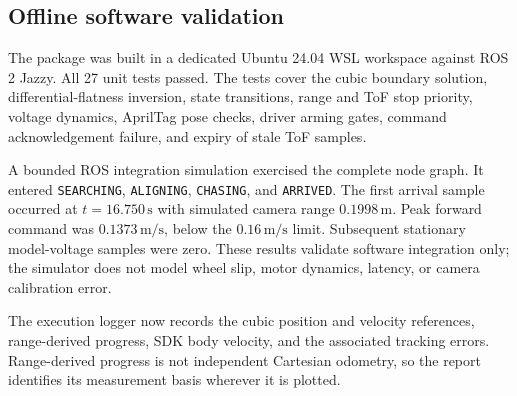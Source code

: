 \subsection{Offline software validation}
The package was built in a dedicated Ubuntu 24.04 WSL workspace against ROS 2 Jazzy. All 27 unit tests passed. The tests cover the cubic boundary solution, differential-flatness inversion, state transitions, range and ToF stop priority, voltage dynamics, AprilTag pose checks, driver arming gates, command acknowledgement failure, and expiry of stale ToF samples.

A bounded ROS integration simulation exercised the complete node graph. It entered \texttt{SEARCHING}, \texttt{ALIGNING}, \texttt{CHASING}, and \texttt{ARRIVED}. The first arrival sample occurred at $t=16.750\,\mathrm{s}$ with simulated camera range $0.1998\,\mathrm{m}$. Peak forward command was $0.1373\,\mathrm{m/s}$, below the $0.16\,\mathrm{m/s}$ limit. Subsequent stationary model-voltage samples were zero. These results validate software integration only; the simulator does not model wheel slip, motor dynamics, latency, or camera calibration error.

The execution logger now records the cubic position and velocity references, range-derived progress, SDK body velocity, and the associated tracking errors. Range-derived progress is not independent Cartesian odometry, so the report identifies its measurement basis wherever it is plotted.
